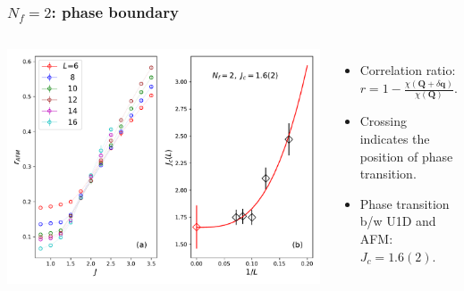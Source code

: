 \documentclass[xcolor=table, 10pt, aspectratio=169]{beamer}
\begin{document}
\begin{frame}
  \frametitle{$N_f=2$: phase boundary}
  \begin{columns}
    \includegraphics[width=\textwidth]{n2rafm}
		\begin{itemize}
			\item Correlation ratio: $r = 1-\frac{\chi(\bm Q+\delta\bm q)}{\chi(\bm Q)}.$
			\item Crossing indicates the position of phase transition.
			\item Phase transition b/w U1D and AFM: $J_c=1.6(2)$.
		\end{itemize}
  \end{columns}
\end{frame}
\end{document}
